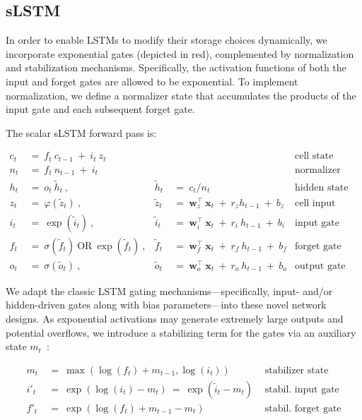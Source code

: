 \subsection{sLSTM}
\label{sec:sLSTM}

In order to enable LSTMs to modify their storage choices dynamically, we incorporate exponential gates (depicted in red), complemented by normalization and stabilization mechanisms. Specifically, the activation functions of both the input and forget gates are allowed to be exponential. To implement normalization, we define a normalizer state that accumulates the products of the input gate and each subsequent forget gate.

The scalar sLSTM forward pass is:

\begin{align}
\label{eq:slstmforward}
c_t \ &= \  f_t \ c_{t-1} \ + \ i_t \ z_t & & 
 &\text{cell state} \\
n_t \ &= \  f_t \ n_{t-1} \ + \ i_t  & & 
 &\text{normalizer state} \\
h_t \ &= \ o_t \ \tilde{h}_t \ ,
  &\tilde{h}_t \ &= \ c_t / n_t
&\text{hidden state} \\
z_t \ &= \ \varphi \left( \tilde{z}_t \right) \ , 
  &\tilde{z}_t \ &=  \ \mathbf{w}^\top_{z} \ \mathbf{x}_t \ + \
  r_{z}  h_{t-1} \ + \  b_{z}
  &\text{cell input} \\
i_t \ &= \ \!\exp \left( \tilde{i}_t  \right) \ , 
  &\tilde{i}_t \ &= \ \mathbf{w}^\top_{i} \ \mathbf{x}_t \ + \
  r_{i}  \ h_{t-1} \ + \  b_{i}
  &\text{input gate} \\
f_t \ &= \ \sigma \left(  \tilde{f}_t \right) \ \text{OR} \
\!\exp \left(  \tilde{f}_t \right) \ ,
  &\tilde{f}_t \ &= \ \mathbf{w}^\top_{f} \ \mathbf{x}_t  \ + \
  r_{f}  \ h_{t-1} \ + \  b_{f}
  &\text{forget gate} \\
o_t \ &= \ \sigma \left( \tilde{o}_t \right) \ , 
  &\tilde{o}_t  \ &= \ \mathbf{w}^\top_{o} \ \mathbf{x}_t \ + \
  r_{o}  \ h_{t-1} \ + \  b_{o}
  &\text{output gate} 
\end{align}

We adapt the classic LSTM gating mechanisms—specifically, input- and/or hidden-driven gates along with bias parameters—into these novel network designs. As exponential activations may generate extremely large outputs and potential overflows, we introduce a stabilizing term for the gates via an auxiliary state \mbox{$m_t$~\citep{Milakov:18arxiv}}:

\begin{align}
\label{eq:slstmstabil}
m_t \ &= \ \max \left( \log ( f_t ) + m_{t-1} , \log ( i_t ) \right) &\text{stabilizer state} \\
i'_t \ &= \ \!\exp \left( \log \left ( i_t \right) - m_t \right) \ = \ \!\exp \left( \tilde{i}_t - m_t \right) \ \, 
  &\text{stabil. input gate} \\
f'_t \ &= \ \!\exp \left( \log \left( f_t \right) + m_{t-1} - m_t \right) \ \, 
  &\text{stabil. forget gate}
\end{align}

